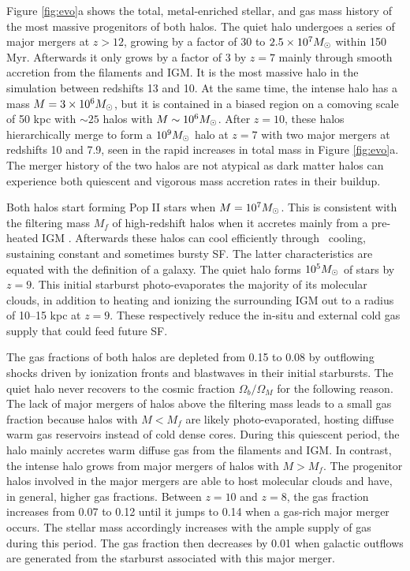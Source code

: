\documentclass[apjl]{emulateapj}
\begin{document}

Figure \ref{fig:evo}a shows the total, metal-enriched stellar, and gas
mass history of the most massive progenitors of both halos.  The quiet
halo undergoes a series of major mergers at $z > 12$, growing by a
factor of 30 to $2.5 \times 10^7 \Ms$ within 150 Myr.  Afterwards it
only grows by a factor of 3 by $z=7$ mainly through smooth accretion
from the filaments and IGM.  It is the most massive halo in the
simulation between redshifts 13 and 10.  At the same time, the intense
halo has a mass $M = 3 \times 10^6 \Ms$, but it is contained in a
biased region on a comoving scale of 50 kpc with $\sim25$ halos with
$M \sim 10^6 \Ms$.  After $z=10$, these halos hierarchically merge to
form a $10^9 \Ms$ halo at $z=7$ with two major mergers at redshifts 10
and 7.9, seen in the rapid increases in total mass in Figure
\ref{fig:evo}a.  The merger history of the two halos are not atypical
as dark matter halos can experience both quiescent and vigorous mass
accretion rates in their buildup.

Both halos start forming Pop II stars when $M = 10^7 \Ms$.  This is
consistent with the filtering mass $M_f$ of high-redshift halos when
it accretes mainly from a pre-heated IGM \citep{gnedin98, gnedin00,
  Wise08_Gal}.  Afterwards these halos can cool efficiently through
\hh~cooling, sustaining constant and sometimes bursty SF.  The latter
characteristics are equated with the definition of a galaxy.  The
quiet halo forms $10^5 \Ms$ of stars by $z=9$.  This initial starburst
photo-evaporates the majority of its molecular clouds, in addition to
heating and ionizing the surrounding IGM out to a radius of 10--15 kpc
at $z=9$.  These respectively reduce the in-situ and external cold gas
supply that could feed future SF.

The gas fractions of both halos are depleted from 0.15 to 0.08 by
outflowing shocks driven by ionization fronts and blastwaves in their
initial starbursts.  The quiet halo never recovers to the cosmic
fraction $\Omega_b/\Omega_M$ for the following reason.  The lack of
major mergers of halos above the filtering mass leads to a small gas
fraction because halos with $M < M_f$ are likely photo-evaporated,
hosting diffuse warm gas reservoirs instead of cold dense cores.
During this quiescent period, the halo mainly accretes warm diffuse
gas from the filaments and IGM.  In contrast, the intense halo grows
from major mergers of halos with $M > M_f$.  The progenitor halos
involved in the major mergers are able to host molecular clouds and
have, in general, higher gas fractions.  Between $z=10$ and $z=8$, the
gas fraction increases from 0.07 to 0.12 until it jumps to 0.14 when a
gas-rich major merger occurs.  The stellar mass accordingly increases
with the ample supply of gas during this period.  The gas fraction
then decreases by 0.01 when galactic outflows are generated from the
starburst associated with this major merger.
\end{document}
